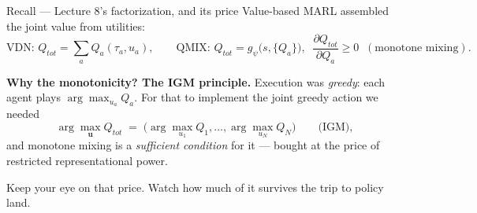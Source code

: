 \documentclass[10pt, aspectratio=169]{beamer}
\begin{document}
\begin{frame}{Recall --- Lecture 8's factorization, and its price}
Value-based MARL assembled the joint value from utilities:
\[
\text{VDN: } Q_{tot} = \textstyle\sum_a Q_a(\tau_a, u_a), \qquad
\text{QMIX: } Q_{tot} = g_\psi\big(s, \{Q_a\}\big), \;\; \frac{\partial Q_{tot}}{\partial Q_a} \ge 0 \;\;(\text{monotone mixing}).
\]
\medskip

\pause
\textbf{Why the monotonicity? The IGM principle.} Execution was \emph{greedy}: each agent plays $\arg\max_{u_a} Q_a$. For that to implement the joint greedy action we needed
\[
\arg\max_{\mathbf{u}} Q_{tot} \;=\; \big( \arg\max_{u_1} Q_1, \dots, \arg\max_{u_N} Q_N \big) \qquad \text{(IGM)},
\]
and monotone mixing is a \emph{sufficient condition} for it --- bought at the price of \alert{restricted representational power}.
\medskip

\pause
\begin{center}
\alert{Keep your eye on that price. Watch how much of it survives the trip to policy land.}
\end{center}
\end{frame}
\end{document}
